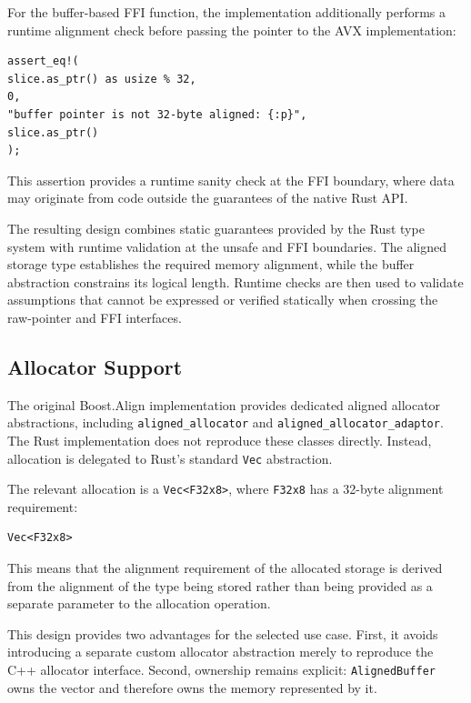 For the buffer-based FFI function, the implementation additionally performs a runtime alignment check before passing 
the pointer to the AVX implementation:

\begin{lstlisting}[style=rustblock]
assert_eq!(
slice.as_ptr() as usize % 32,
0,
"buffer pointer is not 32-byte aligned: {:p}",
slice.as_ptr()
);
\end{lstlisting}

This assertion provides a runtime sanity check at the FFI boundary, where data may originate from code outside the 
guarantees of the native Rust API.

The resulting design combines static guarantees provided by the Rust type system with runtime validation at the unsafe 
and FFI boundaries. The aligned storage type establishes the required memory alignment, while the buffer abstraction 
constrains its logical length. Runtime checks are then used to validate assumptions that cannot be expressed
or verified statically when crossing the raw-pointer and FFI interfaces.


\subsection{Allocator Support}

The original Boost.Align implementation provides dedicated aligned allocator abstractions, 
including \lstinline|aligned_allocator| and \lstinline|aligned_allocator_adaptor|. 
The Rust implementation does not reproduce these classes directly. 
Instead, allocation is delegated to Rust's standard \lstinline|Vec| abstraction.

The relevant allocation is a \lstinline|Vec<F32x8>|, where \lstinline|F32x8| has a 32-byte alignment requirement:

\begin{lstlisting}[style=rustblock]
Vec<F32x8>
\end{lstlisting}

This means that the alignment requirement of the allocated storage is derived from the alignment of the type being 
stored rather than being provided as a separate parameter to the allocation operation.

This design provides two advantages for the selected use case. First, it avoids introducing a separate custom allocator 
abstraction merely to reproduce the C++ allocator interface. Second, ownership remains explicit: 
\lstinline|AlignedBuffer| owns the vector and therefore owns the memory represented by it.

